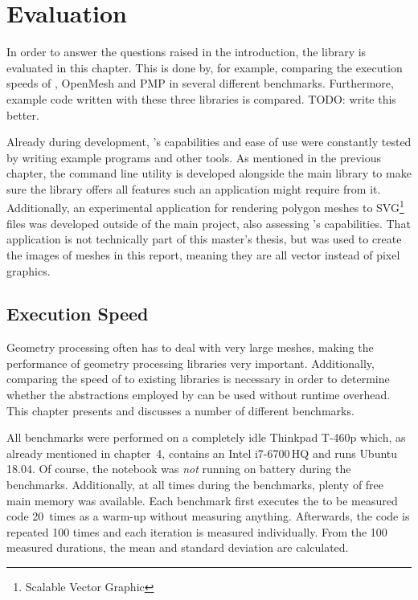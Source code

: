\chapter{Evaluation}

In order to answer the questions raised in the introduction, the library  is evaluated in this chapter.
This is done by, for example, comparing the execution speeds of , OpenMesh and PMP in several different benchmarks.
Furthermore, example code written with these three libraries is compared.  TODO: write this better.

Already during development, 's capabilities and ease of use were constantly tested by writing example programs and other tools.
As mentioned in the previous chapter, the command line utility  is developed alongside the main library to make sure the library offers all features such an application might require from it.
Additionally, an experimental application for rendering polygon meshes to SVG\footnote{Scalable Vector Graphic} files was developed outside of the main project, also assessing 's capabilities.
That application is not technically part of this master's thesis, but was used to create the images of meshes in this report, meaning they are all vector instead of pixel graphics.


\section{Execution Speed}

Geometry processing often has to deal with very large meshes, making the performance of geometry processing libraries very important.
Additionally, comparing the speed of  to existing libraries is necessary in order to determine whether the abstractions employed by  can be used without runtime overhead.
This chapter presents and discusses a number of different benchmarks.

All benchmarks were performed on a completely idle \textsf{Thinkpad T-460p} which, as already mentioned in chapter~4, contains an \textsf{Intel i7-6700\,HQ} and runs \textsf{Ubuntu 18.04}.
Of course, the notebook was \emph{not} running on battery during the benchmarks.
Additionally, at all times during the benchmarks, plenty of free main memory was available.
Each benchmark first executes the to be measured code 20~times as a warm-up without measuring anything.
Afterwards, the code is repeated 100 times and each iteration is measured individually.
From the 100 measured durations, the mean and standard deviation are calculated.

